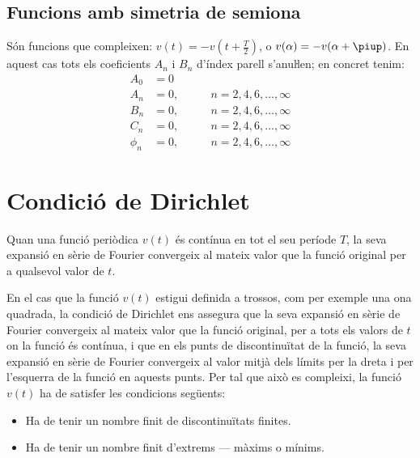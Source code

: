 \subsection{Funcions amb simetria de semiona}

Són funcions que compleixen: $v(t) = -v(t+\frac{T}{2})$, o $v(\alpha) = -v(\alpha+\piup)$. En aquest
cas tots els coeficients $A_n$ i $B_n$ d'índex parell s'anuŀlen;
en concret tenim:
\begin{subequations}
\begin{alignat}{2}
    A_0 &= 0       & \\[0.5ex]
    A_n &= 0,       &\qquad n = 2,4,6,\ldots,\infty\\[0.5ex]
    B_n &= 0,      &\qquad n = 2,4,6,\ldots,\infty\\[0.5ex]
    C_n &= 0,       &\qquad n = 2,4,6,\ldots,\infty\\[0.5ex]
    \phi_n &= 0, &\qquad n = 2,4,6,\ldots,\infty
\end{alignat}
\end{subequations}

\section{Condició de Dirichlet}

Quan una funció periòdica $v(t)$  és contínua en tot el seu període
$T$, la seva expansió en sèrie de Fourier convergeix al mateix valor
que la funció original per a qualsevol valor de $t$.

En el cas que la funció $v(t)$ estigui definida a trossos, com per
exemple una ona quadrada, la condició de Dirichlet ens assegura que
la seva expansió en sèrie de Fourier convergeix al mateix valor que
la funció original, per a tots els valors de $t$ on la funció és
contínua, i que en els punts de discontinuïtat de la funció, la seva
expansió en sèrie de Fourier convergeix al valor mitjà dels límits
per la dreta i per l'esquerra de la funció en aquests punts. Per tal
que això es compleixi, la funció $v(t)$ ha de satisfer les condicions
següents:
\begin{itemize}
   \item Ha de tenir un nombre finit de discontinuïtats
   finites.
   \item Ha de tenir un nombre finit d'extrems --- màxims o mínims.
\end{itemize}

